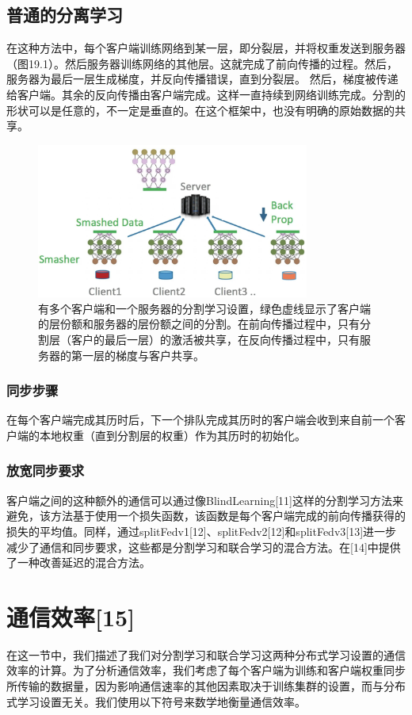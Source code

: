 \subsection{普通的分离学习}
在这种方法中，每个客户端训练网络到某一层，即分裂层，并将权重发送到服务器（图19.1）。然后服务器训练网络的其他层。这就完成了前向传播的过程。然后，服务器为最后一层生成梯度，并反向传播错误，直到分裂层。
然后，梯度被传递给客户端。其余的反向传播由客户端完成。这样一直持续到网络训练完成。分割的形状可以是任意的，不一定是垂直的。在这个框架中，也没有明确的原始数据的共享。
\begin{figure}
	\centering
	\includegraphics[width=0.8\textwidth]{chapter19/images/Fig.19.1}
	\caption{有多个客户端和一个服务器的分割学习设置，绿色虚线显示了客户端的层份额和服务器的层份额之间的分割。在前向传播过程中，只有分割层（客户的最后一层）的激活被共享，在反向传播过程中，只有服务器的第一层的梯度与客户共享。} \label{fig:19.1}
\end{figure}

\subsubsection{同步步骤}
在每个客户端完成其历时后，下一个排队完成其历时的客户端会收到来自前一个客户端的本地权重（直到分割层的权重）作为其历时的初始化。

\subsubsection{放宽同步要求}
客户端之间的这种额外的通信可以通过像BlindLearning[11]这样的分割学习方法来避免，该方法基于使用一个损失函数，该函数是每个客户端完成的前向传播获得的损失的平均值。同样，通过splitFedv1[12]、splitFedv2[12]和splitFedv3[13]进一步减少了通信和同步要求，这些都是分割学习和联合学习的混合方法。在[14]中提供了一种改善延迟的混合方法。

 \section{通信效率[15]}
在这一节中，我们描述了我们对分割学习和联合学习这两种分布式学习设置的通信效率的计算。为了分析通信效率，我们考虑了每个客户端为训练和客户端权重同步所传输的数据量，因为影响通信速率的其他因素取决于训练集群的设置，而与分布式学习设置无关。我们使用以下符号来数学地衡量通信效率。

